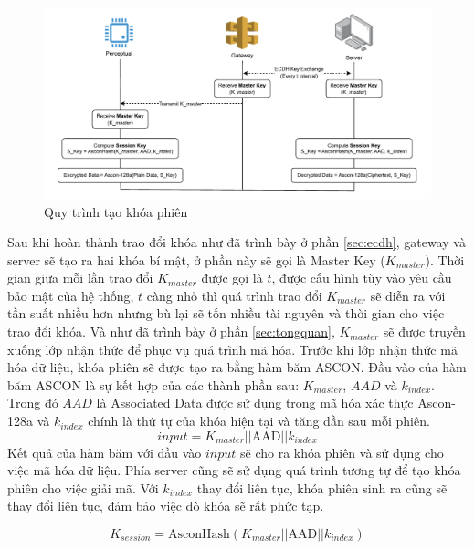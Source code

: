 \begin{figure}[h]
    \centering
    \includegraphics[width=1\linewidth]{skey.pdf}
    \caption{Quy trình tạo khóa phiên}
    \label{fig:skey}
\end{figure}

Sau khi hoàn thành trao đổi khóa như đã trình bày ở phần \ref{sec:ecdh}, gateway và server sẽ tạo ra hai khóa bí mật, ở phần này sẽ gọi là Master Key ($K_{master}$). Thời gian giữa mỗi lần trao đổi $K_{master}$ được gọi là $t$, được cấu hình tùy vào yêu cầu bảo mật của hệ thống, $t$ càng nhỏ thì quá trình trao đổi $K_{master}$ sẽ diễn ra với tần suất nhiều hơn nhưng bù lại sẽ tốn nhiều tài nguyên và thời gian cho việc trao đổi khóa. Và như đã trình bày ở phần \ref{sec:tongquan}, $K_{master}$ sẽ được truyền xuống lớp nhận thức để phục vụ quá trình mã hóa.  Trước khi lớp nhận thức mã hóa dữ liệu, khóa phiên sẽ được tạo ra bằng hàm băm ASCON. Đầu vào của hàm băm ASCON là sự kết hợp của các thành phần sau: $K_{master}$, $AAD$ và $k_{index}$. Trong đó $AAD$ là Associated Data được sử dụng trong mã hóa xác thực Ascon-128a và $k_{index}$ chính là thứ tự của khóa hiện tại và tăng dần sau mỗi phiên. 
\[
input = K_{master} || \text{AAD} ||k_{index}
\]
Kết quả của hàm băm với đầu vào $input$ sẽ cho ra khóa phiên và sử dụng cho việc mã hóa dữ liệu. Phía server cũng sẽ sử dụng quá trình tương tự để tạo khóa phiên cho việc giải mã. Với $k_{index}$ thay đổi liên tục, khóa phiên sinh ra cũng sẽ thay đổi liên tục, đảm bảo việc dò khóa sẽ rất phức tạp. 

\[
    K_{session} = \text{AsconHash}(K_{master} || \text{AAD} ||k_{index})
\]

